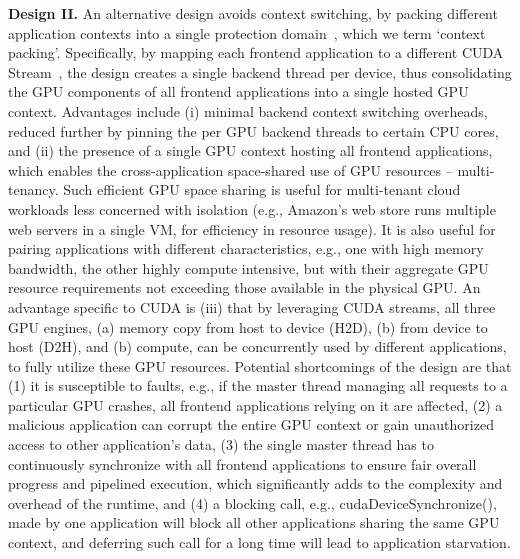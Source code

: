 \textbf{Design II.}
 An alternative design avoids context switching, by packing different application contexts into a single protection domain~\cite{liedtke}, which we term `context packing'. Specifically,   by   mapping   each   frontend   application  to  a different CUDA Stream~\cite{GPU5, ravi}, the design creates a single backend thread per device, thus consolidating the GPU components of all frontend applications into a single hosted GPU context. Advantages include (i) minimal backend context switching  overheads,  reduced  further by pinning the per GPU backend threads to certain CPU cores, and (ii) the presence of a single GPU context hosting all frontend applications, which enables the cross-application space-shared use of GPU resources – multi-tenancy. Such efficient GPU space sharing is useful for multi-tenant cloud workloads less concerned with isolation (e.g., Amazon's web store runs multiple web servers in a single VM, for efficiency in resource usage). It is also useful for pairing applications with different characteristics, e.g., one with high memory bandwidth, the other highly compute   intensive,   but  with  their  aggregate  GPU  resource requirements not exceeding those available in the physical GPU. An advantage specific to CUDA is (iii) that by leveraging CUDA streams, all three GPU engines, (a) memory copy from host to device (H2D), (b) from device to host (D2H), and (b) compute, can be concurrently used by different applications, to fully utilize these GPU resources. Potential shortcomings of the design are that (1) it is susceptible to faults, e.g., if the master thread managing all requests to a particular GPU crashes, all frontend applications relying on it are affected, (2) a malicious application can corrupt the entire GPU context or gain unauthorized access to other application’s data, (3) the single master thread has to continuously synchronize with all frontend applications to ensure fair overall progress and pipelined execution, which significantly adds to the complexity and overhead of the runtime, and (4) a blocking call, e.g., cudaDeviceSynchronize(), made by one application will block all other applications sharing the same GPU context, and deferring such call for a long time will lead to application starvation.

